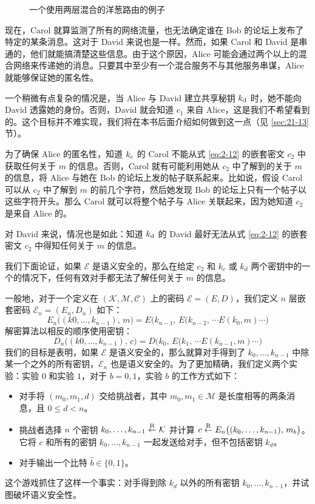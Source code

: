 \begin{figure}
	\centering
	
	\caption{一个使用两层混合的洋葱路由的例子}
	\label{fig:2-7}
\end{figure}

现在，Carol 就算监测了所有的网络流量，也无法确定谁在 Bob 的论坛上发布了特定的某条消息。这对于 David 来说也是一样。然而，如果 Carol 和 David 是串通的，他们就能搞清楚这些信息。由于这个原因，Alice 可能会通过两个以上的混合网络来传递她的消息。只要其中至少有一个混合服务不与其他服务串谋，Alice 就能够保证她的匿名性。

一个稍微有点复杂的情况是，当 Alice 与 David 建立共享秘钥 $k_{\rm d}$ 时，她不能向 David 透露她的身份。否则，David 就会知道 $c_1$ 来自 Alice，这是我们不希望看到的。这个目标并不难实现，我们将在本书后面介绍如何做到这一点（见 \ref{sec:21-13} 节）。

\begin{snote}[嵌套加密的安全性。]
为了确保 Alice 的匿名性，知道 $k_{\rm c}$ 的 Carol 不能从式 \ref{eq:2-12} 的嵌套密文 $c_2$ 中获取任何关于 $m$ 的信息。否则，Carol 就有可能利用她从 $c_2$ 中了解到的关于 $m$ 的信息，将 Alice 与她在 Bob 的论坛上发的帖子联系起来。比如说，假设 Carol 可以从 $c_2$ 中了解到 $m$ 的前几个字符，然后她发现 Bob 的论坛上只有一个帖子以这些字符开头。那么 Carol 就可以将整个帖子与 Alice 关联起来，因为她知道 $c_2$ 是来自 Alice 的。

对 David 来说，情况也是如此：知道 $k_{\rm d}$ 的 David 最好无法从式 \ref{eq:2-12} 的嵌套密文 $c_2$ 中得知任何关于 $m$ 的信息。

我们下面论证，如果 $\mathcal{E}$ 是语义安全的，那么在给定 $c_2$ 和 $k_c$ 或 $k_d$ 两个密钥中的一个的情况下，任何有效对手都无法了解任何关于 $m$ 的信息。
\end{snote}

一般地，对于一个定义在 $(\mathcal{K},\mathcal{M},\mathcal{C})$ 上的密码 $\mathcal{E}=(E,D)$，我们定义 $n$ 层嵌套密码 $\mathcal{E}_n=(E_n,D_n)$ 如下：
\[
E_n\big((k0,\dots,k_{n-1}),\,m\big)=E\big(k_{n-1},\,E(k_{n-2},\,\cdots E(k_0,m)\cdots\big)
\]
解密算法以相反的顺序使用密钥：
\[
D_n\big((k0,\dots,k_{n-1}),\,c\big)=D\big(k_0,\,E(k_1,\,\cdots E(k_{n-1},m)\cdots\big)
\]
我们的目标是表明，如果 $\mathcal{E}$ 是语义安全的，那么就算对手得到了 $k_0,\dots,k_{n-1}$ 中除某一个之外的所有密钥，$\mathcal{E}_n$ 也是语义安全的。为了更加精确，我们定义两个实验：实验 $0$ 和实验 $1$，对于 $b=0,1$，实验 $b$ 的工作方式如下：
\begin{itemize}
	\item 对手将 $(m_0,m_1,d)$ 交给挑战者，其中 $m_0,m_1\in\mathcal{M}$ 是长度相等的两条消息，且 $0\leq d<n$。
	\item 挑战者选择 $n$ 个密钥 $k_0,\dots,k_{n-1}\overset{\rm R}\leftarrow\mathcal{K}$ 并计算 $c\overset{\rm R}\leftarrow E_n\big((k_0,\dots,k_{n-1}),\,m_b\big)$。它将 $c$ 和所有的密钥 $k_0,\dots,k_{n-1}$ 一起发送给对手，但不包括密钥 $k_{d}$。
	\item 对手输出一个比特 $\hat b\in\{0,1\}$。
\end{itemize}
这个游戏抓住了这样一个事实：对手得到除 $k_{d}$ 以外的所有密钥 $k_0,\dots,k_{n-1}$，并试图破坏语义安全性。

